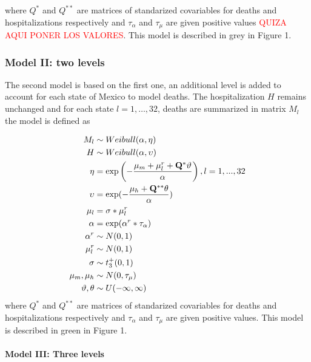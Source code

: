 \documentclass[10pt,letterpaper]{article}
\begin{document}
where \(Q^*\) and \(Q^{**}\) are matrices of standarized covariables for
deaths and hospitalizations respectively and \(\tau_\alpha\) and
\(\tau_{\mu}\) are given positive values \textcolor{red}{QUIZA AQUI PONER LOS VALORES}. This model is described in
grey in Figure 1.

\hypertarget{model-ii-two-levels}{%
\subsubsection{Model II: two levels}\label{model-ii-two-levels}}

The second model is based on the first one, an additional level is added
to account for each state of Mexico to model deaths. The hospitalization
\(H\) remains unchanged and for each state \(l= 1,\ldots, 32\), deaths are summarized in matrix \(M_{l}\) the model is
defined as

\[
\begin{aligned}
 M_l   &\sim Weibull(\alpha,\mathbf{\eta})\\
 H  &\sim Weibull(\alpha,\mathbf{\upsilon}) \\
 \mathbf{\eta} &= \exp\left(-\frac{\mu_m+\mathbf{\mu}_l^r+\mathbf{Q}^*\mathbf{\vartheta}}{\alpha}\right),\space\space l=1,...,32\\
 \mathbf{\upsilon} &= \exp(-\frac{\mu_h+\mathbf{Q}^{**}\mathbf{\theta}}{\alpha}) \\
 \mathbf{\mu}_l&=\sigma*\mathbf{\mu}_l^r \\
 \alpha&=\exp(\alpha^r*\tau_\alpha) \\
 \alpha^r&\sim N(0,1) \\
 \mu^r_l&\sim N(0,1) \\
 \sigma&\sim t^+_3(0,1) \\
 \mu_m,\mu_h &\sim N(0,\tau_\mu) \\
 \mathbf{\vartheta},\mathbf{\theta} &\sim U(-\infty,\infty) \\
\end{aligned}
\] where \(Q^*\) and \(Q^{**}\) are matrices of standarized covariables
for deaths and hospitalizations respectively and \(\tau_\alpha\) and
\(\tau_{\mu}\) are given positive values. This model is described in
green in Figure 1.

\hypertarget{model-iii-three-levels}{%
\paragraph{Model III: Three levels}\label{model-iii-three-levels}}
\end{document}

